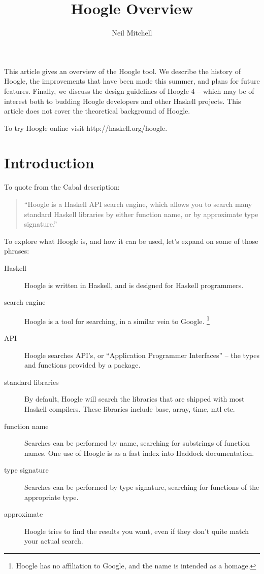 \documentclass{tmr}
\title{Hoogle Overview}
\author{Neil Mitchell\email{ndmitchell@gmail.com}}
\begin{document}
\begin{introduction}
This article gives an overview of the Hoogle tool. We describe the history of Hoogle, the improvements that have been made this summer, and plans for future features. Finally, we discuss the design guidelines of Hoogle 4 -- which may be of interest both to budding Hoogle developers and other Haskell projects. This article does not cover the theoretical background of Hoogle.

To try Hoogle online visit \textsf{http://haskell.org/hoogle}.
\end{introduction}

\section{Introduction}

To quote from the Cabal description:

\begin{quote}
``Hoogle is a Haskell API search engine, which allows you to search many standard Haskell libraries by either function name, or by approximate type signature.''
\end{quote}

To explore what Hoogle is, and how it can be used, let's expand on some of those phrases:

\begin{description}
\item[Haskell] Hoogle is written in Haskell, and is designed for Haskell programmers.
\item[search engine] Hoogle is a tool for searching, in a similar vein to Google. \footnote{Hoogle has no affiliation to Google, and the name is intended as a homage.}
\item[API] Hoogle searches API's, or ``Application Programmer Interfaces'' -- the types and functions provided by a package.
\item[standard libraries] By default, Hoogle will search the libraries that are shipped with most Haskell compilers. These libraries include base, array, time, mtl etc.
\item[function name] Searches can be performed by name, searching for substrings of function names. One use of Hoogle is as a fast index into Haddock documentation.
\item[type signature] Searches can be performed by type signature, searching for functions of the appropriate type.
\item[approximate] Hoogle tries to find the results you want, even if they don't quite match your actual search.
\end{description}
\end{document}
